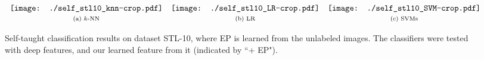 \documentclass[preprint,12pt,3p]{elsarticle}
\begin{document}

\begin{figure*} 
  \centering
   $ \begin{array}{cccc}
\texttt{[image: ./self\_stl10\_knn-crop.pdf]}& 
\texttt{[image: ./self\_stl10\_LR-crop.pdf]}& 
\texttt{[image: ./self\_stl10\_SVM-crop.pdf]} \\
\scriptsize{\text{(a) $k$-NN}}  & \scriptsize{\text{(b) LR}} & \scriptsize{\text{(c) SVMs}}
\end{array}$
\caption{Self-taught classification results on dataset STL-10, where EP is learned from the unlabeled images. The
  classifiers were tested with deep features, and our learned feature from it (indicated by ``+ EP").}
  \label{fig:stl}
\end{figure*}
\end{document}
